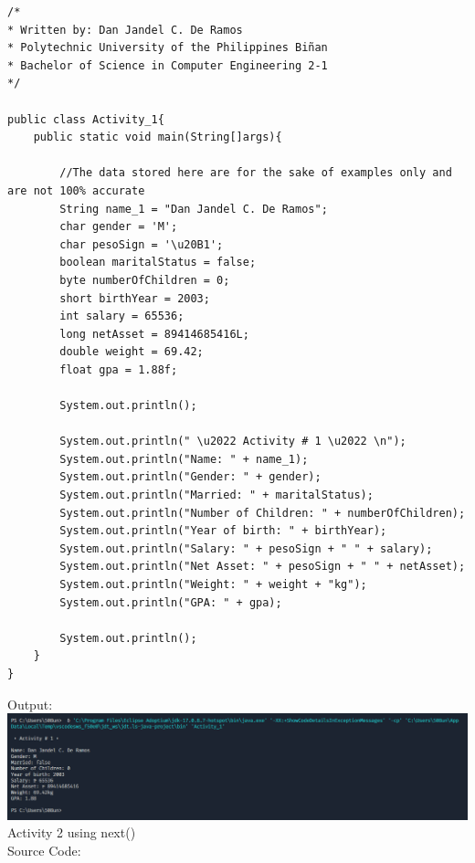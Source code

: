 \documentclass[12pt]{article}
\begin{document}
	\begin{verbatim}         
/*
* Written by: Dan Jandel C. De Ramos
* Polytechnic University of the Philippines Biñan
* Bachelor of Science in Computer Engineering 2-1
*/
		
public class Activity_1{
	public static void main(String[]args){         
				
		//The data stored here are for the sake of examples only and are not 100% accurate        
		String name_1 = "Dan Jandel C. De Ramos";        
		char gender = 'M';
		char pesoSign = '\u20B1';
		boolean maritalStatus = false;
		byte numberOfChildren = 0;
		short birthYear = 2003;
		int salary = 65536;  
		long netAsset = 89414685416L;
		double weight = 69.42;
		float gpa = 1.88f;
		
		System.out.println();
		
		System.out.println(" \u2022 Activity # 1 \u2022 \n");
		System.out.println("Name: " + name_1);
		System.out.println("Gender: " + gender);
		System.out.println("Married: " + maritalStatus);
		System.out.println("Number of Children: " + numberOfChildren);
		System.out.println("Year of birth: " + birthYear);
		System.out.println("Salary: " + pesoSign + " " + salary);
		System.out.println("Net Asset: " + pesoSign + " " + netAsset);
		System.out.println("Weight: " + weight + "kg");
		System.out.println("GPA: " + gpa);       
				
		System.out.println();        
	}
}
	\end{verbatim}
	\clearpage
	\noindent
	Output:\\
	\includegraphics[width=\textwidth]{output1}
	\clearpage
	\noindent
	Activity 2 using next()\\
	Source Code:
\end{document}
